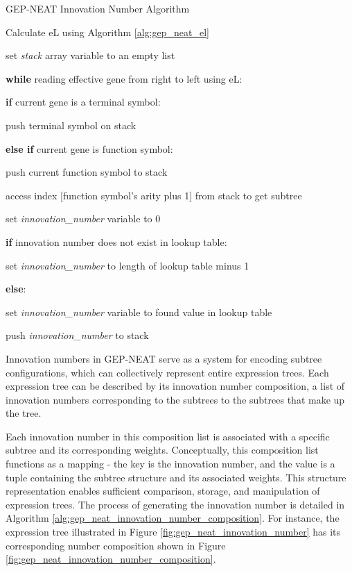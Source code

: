 \parbreak
\begin{algorithm}
	\caption{GEP-NEAT Innovation Number Algorithm}\label{alg:gep_neat_innovation_number}
	\begin{algorithmic}[1]
	\item Calculate eL using Algorithm \ref{alg:gep_neat_el}
	\item set \textit{stack} array variable to an empty list
	\item \textbf{while} reading effective gene from right to left using eL:
	\item \quad \textbf{if} current gene is a terminal symbol:
	\item \quad \quad push terminal symbol on stack
	\item \quad \textbf{else if} current gene is function symbol:
	\item \quad \quad push current function symbol to stack
	\item \quad \quad access index [function symbol's arity plus 1] from stack to get subtree
	\item \quad \quad set \textit{innovation\_number} variable to 0
	\item \quad \quad \textbf{if} innovation number does not exist in lookup table:
	\item \quad \quad \quad set \textit{innovation\_number}  to length of lookup table minus 1
	\item \quad \quad \textbf{else}:
	\item \quad \quad \quad set \textit{innovation\_number} variable to found value in lookup table
	\item \quad \quad push \textit{innovation\_number} to stack
\end{algorithmic}
\end{algorithm}

\parbreak\noindent Innovation numbers in GEP-NEAT serve as a system for encoding subtree configurations, which can collectively represent entire expression trees. Each expression tree can be described by its innovation number composition, a list of innovation numbers corresponding to the subtrees to the subtrees that make up the tree.

\parbreak\noindent Each innovation number in this composition list is associated with a specific subtree and its corresponding weights. Conceptually, this composition list functions as a mapping - the key is the innovation number, and the value is a tuple containing the subtree structure and its associated weights. This structure representation enables sufficient comparison, storage, and manipulation of expression trees. The process of generating the innovation number is detailed in Algorithm \ref{alg:gep_neat_innovation_number_composition}. For instance, the expression tree illustrated in Figure \ref{fig:gep_neat_innovation_number} has its corresponding number composition shown in Figure \ref{fig:gep_neat_innovation_number_composition}.

